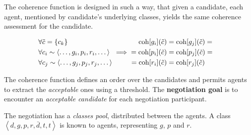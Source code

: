 The coherence function is designed in such a way, that given a candidate,
each agent, mentioned by candidate's underlying classes, yields the same
coherence assessment for the candidate.


\begin{align*}
  \begin{aligned}
    &\forall \tilde{c} = \{c_k\} \\
    &\forall c_i \sim \left< \dots, g_i, p_i, r_i, \dots \right> \\
    &\forall c_j \sim \left< \dots, g_j, p_j, r_j, \dots \right>
  \end{aligned}
& \implies
  \begin{aligned}
   \mathrm{coh}[g_i](\tilde c) &= \mathrm{coh}[g_j](\tilde c) = \\
   = \mathrm{coh}[p_i](\tilde c) &= \mathrm{coh}[p_j](\tilde c) = \\  
   = \mathrm{coh}[r_i](\tilde c) &= \mathrm{coh}[r_j](\tilde c)
  \end{aligned}
\end{align*}

\medskip

\noindent
The coherence function defines an order over the candidates and permits
agents to extract the \emph{acceptable} ones using a threshold.
The \textbf{negotiation goal} is to encounter an \emph{acceptable candidate}
for each negotiation participant.







The negotiation has a \emph{classes pool}, distributed between the agents.
A class $\left< d, g, p, r, \bar d, t, t \right>$ is known to agents,
representing $g$, $p$ and $r$.

%
